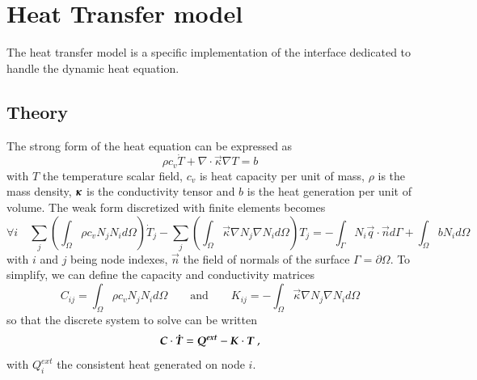 \chapter{Heat Transfer model}

The heat transfer model is a specific implementation of the  interface
dedicated to handle the dynamic heat equation. 
\section{Theory}
The strong form of the heat equation 
can be expressed as
\begin{equation}
  \rho c_v \dot{T} + \nabla \cdot \vec{\kappa} \nabla T = b
\end{equation}
with $T$ the temperature scalar field,
$c_v$ is heat capacity per unit of mass, 
$\rho$ is the mass density, 
$\boldsymbol{\kappa}$ is the conductivity tensor and $b$ is the heat generation per unit of volume. 
The weak form discretized with finite elements becomes
\begin{equation}
  \forall i \quad 
  \sum_j \left( \int_\Omega \rho c_v N_j N_i  d\Omega \right) \dot{T}_j 
  - \sum_j \left( \int_\Omega \vec{\kappa} \nabla N_j \nabla N_i d\Omega \right) T_j = 
  - \int_{\Gamma}  N_i \vec{q} \cdot \vec{n} d\Gamma + \int_\Omega b N_i d\Omega
\end{equation}
with $i$ and $j$ being node indexes, $\vec{n}$ the field of normals of the surface 
$\Gamma = \partial \Omega$. 
To simplify, we can define the capacity and conductivity matrices
\begin{equation}
  C_{ij} = \int_\Omega \rho c_v N_j N_i  d\Omega \qquad \textrm{and} \qquad   
  K_{ij} = - \int_\Omega \vec{\kappa} \nabla N_j \nabla N_i d\Omega
\end{equation}
so that the discrete system to solve can be written
\begin{equation}
  \boldsymbol{C} \cdot \boldsymbol{\dot{T}} = \boldsymbol{Q^{ext}} -\boldsymbol{K} \cdot \boldsymbol{T}~, 
\end{equation}
with $Q^{ext}_i$ the consistent heat generated on node $i$.
